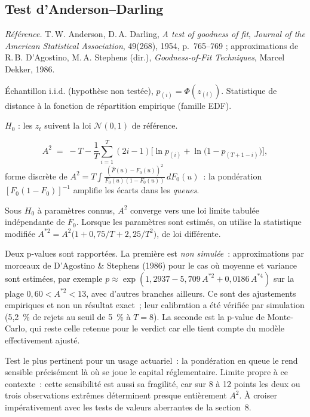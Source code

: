 \documentclass[a4paper,11pt]{article}
\newcommand{\refl}[1]{{\small\textcolor{maincolor!70!black}{\textit{Référence.} #1}}\par\smallskip}
\newcounter{ficheid}
\newenvironment{fiche}[1]{%
  \stepcounter{ficheid}%
  \phantomsection
  \subsection{#1}%
  \label{fiche:\theficheid}%
}{%
  \end{description}\vspace{0.5em}%
}
\newcommand{\Cadre}{%
  \begin{description}[leftmargin=0pt, style=unboxed, itemsep=3pt, topsep=3pt, parsep=2pt]%
  \item[\textcolor{financeblue}{\textbf{1. Cadre, notations et hypothèses de validité (non testées).}}]}
\newcommand{\Hzero}{\item[\textcolor{financeblue}{\textbf{2. Hypothèse nulle.}}]}
\newcommand{\Stat}{\item[\textcolor{financeblue}{\textbf{3. Statistique de test.}}]}
\newcommand{\Loi}{\item[\textcolor{financeblue}{\textbf{4. Loi sous $H_0$.}}]}
\newcommand{\Pval}{\item[\textcolor{financeblue}{\textbf{5. p-value.}}]}
\newcommand{\Usage}{\item[\textcolor{financeblue}{\textbf{6. Usage et limites.}}]}
\begin{document}
\begin{fiche}{Test d'Anderson--Darling}
\refl{T.\,W. Anderson, D.\,A. Darling, \emph{A test of goodness of fit}, \emph{Journal of the
American Statistical Association}, 49(268), 1954, p.~765--769 ; approximations de
R.\,B. D'Agostino, M.\,A. Stephens (dir.), \emph{Goodness-of-Fit Techniques}, Marcel Dekker,
1986.}
\Cadre
Échantillon i.i.d. (hypothèse non testée), $p_{(i)} = \Phi(z_{(i)})$. Statistique de distance à la
fonction de répartition empirique (famille EDF).
\Hzero
$H_0$ : les $z_t$ suivent la loi $\mathcal{N}(0,1)$ de référence.
\Stat
\[
  A^2 \;=\; -T - \frac{1}{T}\sum_{i=1}^{T} (2i-1)\Big[\ln p_{(i)} + \ln\big(1 - p_{(T+1-i)}\big)\Big],
\]
forme discrète de
$A^2 = T\int \frac{(\hat F(u)-F_0(u))^2}{F_0(u)(1-F_0(u))}\,dF_0(u)$~: la pondération
$[F_0(1-F_0)]^{-1}$ amplifie les écarts dans les \emph{queues}.
\Loi
Sous $H_0$ à paramètres connus, $A^2$ converge vers une loi limite tabulée indépendante de $F_0$.
Lorsque les paramètres sont estimés, on utilise la statistique modifiée
$A^{*2} = A^2\big(1 + 0{,}75/T + 2{,}25/T^2\big)$, de loi différente.
\Pval
Deux p-values sont rapportées. La première est \emph{non simulée}~: approximations par
morceaux de D'Agostino \& Stephens (1986) pour le cas où moyenne et variance sont estimées, par
exemple $p \approx \exp(1{,}2937 - 5{,}709\,A^{*2} + 0{,}0186\,A^{*4})$ sur la plage
$0{,}60 < A^{*2} < 13$, avec d'autres branches ailleurs. Ce sont des ajustements empiriques et non
un résultat exact~; leur calibration a été vérifiée par simulation (5,2~\% de rejets au seuil de
5~\% à $T = 8$). La seconde est la p-value de Monte-Carlo, qui reste celle retenue pour le verdict
car elle tient compte du modèle effectivement ajusté.
\Usage
Test le plus pertinent pour un usage actuariel~: la pondération en queue le rend sensible
précisément là où se joue le capital réglementaire. Limite propre à ce contexte~: cette
sensibilité est aussi sa fragilité, car sur 8 à 12 points les deux ou trois observations extrêmes
déterminent presque entièrement $A^2$. À croiser impérativement avec les tests de valeurs
aberrantes de la section~8.
\end{fiche}
\end{document}

